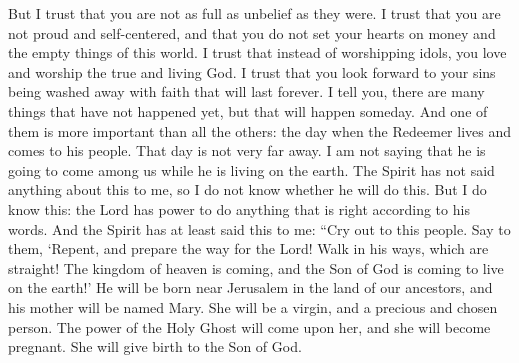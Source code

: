 But I trust that you are not as full as unbelief as they were. I trust that you are not proud and self-centered, and that you do not set your hearts on money and the empty things of this world. I trust that instead of worshipping idols, you love and worship the true and living God. I trust that you look forward to your sins being washed away with faith that will last forever.
\bverse \iffalse For behold, I say unto you there be many things to come; and behold, there is one thing which is of more importance than they all--for behold, the time is not far distant that the Redeemer liveth and cometh among his people. \fi
I tell you, there are many things that have not happened yet, but that will happen someday. And one of them is more important than all the others: the day when the Redeemer lives and comes to his people. That day is not very far away.
\bverse \iffalse Behold, I do not say that he will come among us at the time of his dwelling in his mortal tabernacle; for behold, the Spirit hath not said unto me that this should be the case. Now as to this thing I do not know; but this much I do know, that the Lord God hath power to do all things which are according to his word. \fi
I am not saying that he is going to come among us while he is living on the earth. The Spirit has not said anything about this to me, so I do not know whether he will do this. But I do know this: the Lord has power to do anything that is right according to his words.
\bverse \iffalse But behold, the Spirit hath said this much unto me, saying: Cry unto this people, saying--Repent ye, and prepare the way of the Lord, and walk in his paths, which are straight; for behold, the kingdom of heaven is at hand, and the Son of God cometh upon the face of the earth. \fi
And the Spirit has at least said this to me: ``Cry out to this people. Say to them, \lq Repent, and prepare the way for the Lord! Walk in his ways, which are straight! The kingdom of heaven is coming, and the Son of God is coming to live on the earth!\rq
\bverse \iffalse And behold, he shall be born of Mary, at Jerusalem which is the land of our forefathers, she being a virgin, a precious and chosen vessel, who shall be overshadowed and conceive by the power of the Holy Ghost, and bring forth a son, yea, even the Son of God. \fi
He will be born near Jerusalem in the land of our ancestors, and his mother will be named Mary. She will be a virgin, and a precious and chosen person. The power of the Holy Ghost will come upon her, and she will become pregnant. She will give birth to the Son of God.
